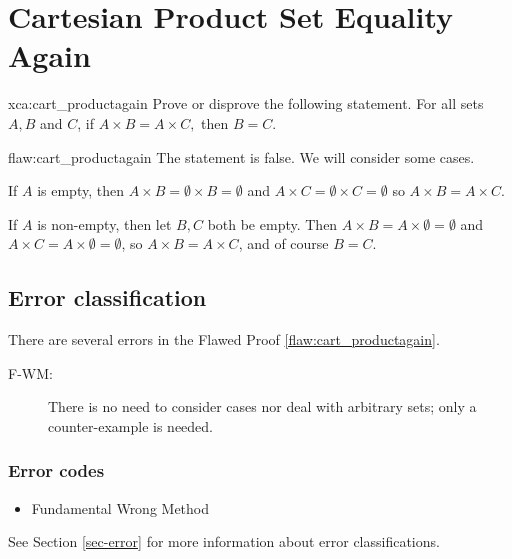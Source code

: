 \section{Cartesian Product Set Equality Again}

\begin{xca}{xca:cart_productagain}
Prove or disprove the following statement. For all sets $A,B$ and $C$, if $A \times B = A \times C,$ then $B=C.$ 
\end{xca}

\begin{flaw}{flaw:cart_productagain} %
The statement is false. We will consider some cases. 

If $A$ is empty, then $A \times B = \emptyset \times B = \emptyset$ and $A \times C = \emptyset \times C = \emptyset$ so $A \times B = A \times C$. 

If $A$ is non-empty, then let $B, C$ both be empty. Then $A \times B = A \times \emptyset = \emptyset$ and $A \times C = A \times \emptyset = \emptyset$, so $A \times B = A\times C$, and of course $B = C$. 
\end{flaw}

\clearpage
\subsection{Error classification}


There are several errors
 in the Flawed Proof \ref{flaw:cart_productagain}. %

 
 \begin{description}
 	\item[F-WM:] There is no need to consider cases nor deal with arbitrary sets; only a counter-example is needed. 
 \end{description}

 
\subsubsection{Error codes}
\begin{itemize}
	\item 	Fundamental Wrong Method
\end{itemize}
See Section \ref{sec-error} for more information about error classifications.

